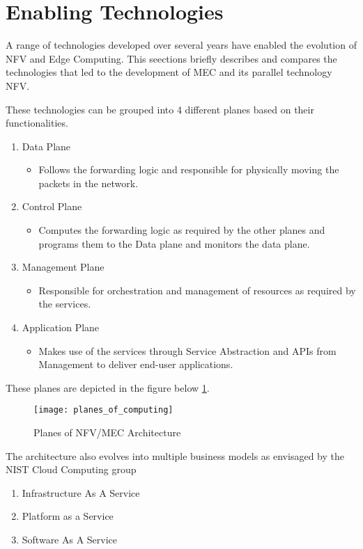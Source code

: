 \section{Enabling Technologies}

A range of technologies developed over several years have enabled the evolution of NFV and Edge Computing. This seections briefly describes and compares the technologies that led to the development of MEC and its parallel technology NFV.

These technologies can be grouped into 4 different planes based on their functionalities.

\begin{enumerate}
    \item Data Plane
	\begin{itemize}
	    \item Follows the forwarding logic and responsible for physically moving the packets in the network.
        \end{itemize}
    \item Control Plane
	\begin{itemize}
	    \item Computes the forwarding logic as required by the other planes and programs them to the Data plane and monitors the data plane.
        \end{itemize}
    \item Management Plane
	\begin{itemize}
	    \item Responsible for orchestration and management of resources as required by the services.
	\end{itemize}
    \item Application Plane
	\begin{itemize}
	    \item Makes use of the services through Service Abstraction and APIs from Management to deliver end-user applications.
	\end{itemize}
\end{enumerate}

These planes are depicted in the figure below \ref{fig:figure6}.

\begin{figure}
	\centering
        \texttt{[image: planes\_of\_computing]}
	\label{fig:figure6}
	\caption{Planes of NFV/MEC Architecture}
\end{figure}

The architecture also evolves into multiple business models as envisaged by the NIST Cloud Computing group

\begin{enumerate}
    \item Infrastructure As A Service
    \item Platform as a Service
    \item Software As A Service
\end{enumerate}
